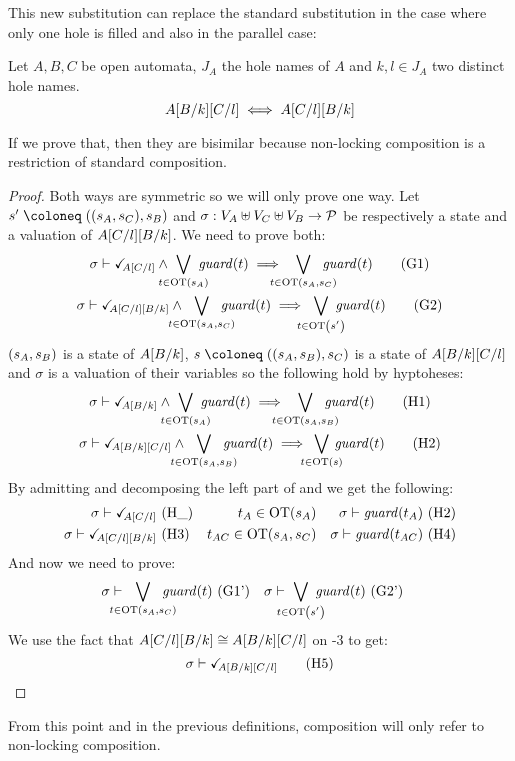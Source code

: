\documentclass{article}
\begin{document}
This new substitution can replace the standard substitution in the case where only one hole is filled and also in the parallel case:
\begin{thm}
Let \(A, B, C\) be open automata, \(J_A\) the hole names of \(A\) and \(k, l \in J_A\) two distinct hole names.
\[ A{\left[B\middle/k\right]}{\left[C\middle/l\right]} \iff A{\left[C\middle/l\right]}{\left[B\middle/k\right]} \]
\end{thm}
If we prove that, then they are bisimilar because non-locking composition is a restriction of standard composition.
\begin{proof}
Both ways are symmetric so we will only prove one way.
Let \(s' \defobject \mpar{\mpar{s_A, s_C}, s_B}\) and \(\sigma: V_A \uplus V_C \uplus V_B \to \mathcal{P}\) be respectively a state and a valuation of \(A{\left[C\middle/l\right]}{\left[B\middle/k\right]}\).
We need to prove both:
\begin{gather}
	\sigma \vdash \reach{A\subst{C}{l}} \wedge \bigvee_\subbox{t \in \fOT{s_A}} \fguard{t} \implies \bigvee_\subbox{t \in \fOT{s_A, s_C}} \fguard{t} \goal{1} \\
	\sigma \vdash \reach{A\subst{C}{l}\subst{B}{k}} \wedge \bigvee_\subbox{t \in \fOT{s_A, s_C}} \fguard{t} \implies \bigvee_\subbox{t \in \fOT{s'}} \fguard{t} \goal{2}
\end{gather}
\({\left(s_A, s_B\right)}\) is a state of \(A{\left[B\middle/k\right]}\), \(s \defobject \mpar{\mpar{s_A, s_B}, s_C}\) is a state of \(A{\left[B\middle/k\right]}{\left[C\middle/l\right]}\) and \(\sigma\) is a valuation of their variables so the following hold by hyptoheses:
\begin{gather}
	\sigma \vdash \reach{A\subst{B}{k}} \wedge \bigvee_\subbox{t \in \fOT{s_A}} \fguard{t} \implies \bigvee_\subbox{t \in \fOT{s_A, s_B}} \fguard{t} \hyp{1} \\
	\sigma \vdash \reach{A\subst{B}{k}\subst{C}{l}} \wedge \bigvee_\subbox{t \in \fOT{s_A, s_B}} \fguard{t} \implies \bigvee_\subbox{t \in \fOT{s}} \fguard{t} \hyp{2}
\end{gather}
By admitting and decomposing the left part of  and  we get the following:
\begin{align*}
	\sigma \vdash \reach{A\subst{C}{l}} & \text{ \hyp{\_}} &
	t_A \in \fOT{s_A} &&
	\sigma \vdash \fguard{t_A} \text{ \hyp{2}} \\
	\sigma \vdash \reach{A\subst{C}{l}\subst{B}{k}} & \text{ \hyp{3}} &
	t_{AC} \in \fOT{s_A, s_C} &&
	\sigma \vdash \fguard{t_{AC}} \text{ \hyp{4}}
\end{align*}
And now we need to prove:
\begin{align*}
	\sigma \vdash \bigvee_\subbox{t \in \fOT{s_A, s_C}} \fguard{t} & \text{ \goal{1'}} &
	\sigma \vdash \bigvee_\subbox{t \in \fOT{s'}} \fguard{t} & \text{ \goal{2'}}
\end{align*}
We use the fact that \(A{\left[C\middle/l\right]}{\left[B\middle/k\right]} \cong A{\left[B\middle/k\right]}{\left[C\middle/l\right]}\) on \hyp{3} to get: %
\[ \sigma \vdash \reach{A\subst{B}{k}\subst{C}{l}} \hyp{5} \]
\end{proof}
From this point and in the previous definitions, composition will only refer to non-locking composition.
\end{document}
